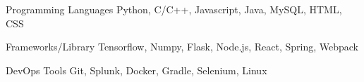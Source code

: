 

\begin{cvskills}


\cvskill
{Programming Languages} %
{Python, C/C++, Javascript, Java, MySQL, HTML, CSS} %

\cvskill
  {Frameworks/Library} %
  {Tensorflow, Numpy, Flask, Node.js, React, Spring, Webpack} %
  
\cvskill
{DevOps Tools}
{Git, Splunk, Docker, Gradle, Selenium, Linux}

\end{cvskills}
